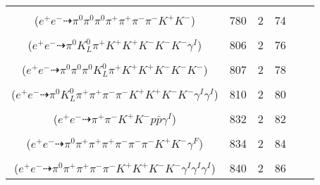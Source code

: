 \documentclass[landscape]{article}
\newcounter{rownumbers}
\newcommand\rn{\stepcounter{rownumbers}\arabic{rownumbers}}
\newcommand{\EOL}{\\} %
\newcommand{\topoTags}[1]{#1} %
\begin{document}
\begin{longtable}{clcccc}
\rn & \makecell[l]{ $ 
e^{+} e^{-} \rightarrow \pi^{0} \pi^{0} \pi^{+} \pi^{+} \pi^{-} \rho^{-} K^{+} K^{-} ,
\rho^{-} \rightarrow \pi^{0} \pi^{-} 
$ \\ ($
e^{+} e^{-} \dashrightarrow \pi^{0} \pi^{0} \pi^{0} \pi^{+} \pi^{+} \pi^{-} \pi^{-} K^{+} K^{-} 
$) } & \topoTags{780 & }2 & 74 \EOL

\rn & \makecell[l]{ $ 
e^{+} e^{-} \rightarrow \pi^{0} \pi^{+} K^{0} K^{-} \phi \phi \gamma^{I} ,
K^{0} \rightarrow K_{L}^{0} ,
\phi \rightarrow K^{+} K^{-} ,
\phi \rightarrow K^{+} K^{-} 
$ \\ ($
e^{+} e^{-} \dashrightarrow \pi^{0} K_{L}^{0} \pi^{+} K^{+} K^{+} K^{-} K^{-} K^{-} \gamma^{I} 
$) } & \topoTags{806 & }2 & 76 \EOL

\rn & \makecell[l]{ $ 
e^{+} e^{-} \rightarrow \pi^{0} \pi^{0} K^{+} K^{+} K^{-} K^{-} K^{*+} K^{*-} ,
K^{*+} \rightarrow \pi^{+} K^{0} ,
K^{*-} \rightarrow \pi^{0} K^{-} ,
K^{0} \rightarrow K_{L}^{0} 
$ \\ ($
e^{+} e^{-} \dashrightarrow \pi^{0} \pi^{0} \pi^{0} K_{L}^{0} \pi^{+} K^{+} K^{+} K^{-} K^{-} K^{-} 
$) } & \topoTags{807 & }2 & 78 \EOL

\rn & \makecell[l]{ $ 
e^{+} e^{-} \rightarrow \pi^{+} \rho^{-} K^{0} \bar{K}^{0} K^{+} K^{-} \phi \gamma^{I} \gamma^{I} ,
\rho^{-} \rightarrow \pi^{0} \pi^{-} ,
K^{0} \rightarrow K_{S}^{0} ,
\bar{K}^{0} \rightarrow K_{L}^{0} ,
\phi \rightarrow K^{+} K^{-} ,
K_{S}^{0} \rightarrow \pi^{+} \pi^{-} 
$ \\ ($
e^{+} e^{-} \dashrightarrow \pi^{0} K_{L}^{0} \pi^{+} \pi^{+} \pi^{-} \pi^{-} K^{+} K^{+} K^{-} K^{-} \gamma^{I} \gamma^{I} 
$) } & \topoTags{810 & }2 & 80 \EOL

\rn & \makecell[l]{ $ 
e^{+} e^{-} \rightarrow \pi^{+} \pi^{-} K^{+} K^{-} p \bar{p} \gamma^{I} 
$ \\ ($
e^{+} e^{-} \dashrightarrow \pi^{+} \pi^{-} K^{+} K^{-} p \bar{p} \gamma^{I} 
$) } & \topoTags{832 & }2 & 82 \EOL

\rn & \makecell[l]{ $ 
e^{+} e^{-} \rightarrow \pi^{0} \rho^{0} \pi^{+} \pi^{-} K^{*} \bar{K}^{*} ,
\rho^{0} \rightarrow \pi^{+} \pi^{-} \gamma^{F} ,
K^{*} \rightarrow \pi^{-} K^{+} ,
\bar{K}^{*} \rightarrow \pi^{+} K^{-} 
$ \\ ($
e^{+} e^{-} \dashrightarrow \pi^{0} \pi^{+} \pi^{+} \pi^{+} \pi^{-} \pi^{-} \pi^{-} K^{+} K^{-} \gamma^{F} 
$) } & \topoTags{834 & }2 & 84 \EOL

\rn & \makecell[l]{ $ 
e^{+} e^{-} \rightarrow \pi^{+} \pi^{-} \pi^{-} \bar{K}^{*} K^{+} K^{-} K^{*+} \gamma^{I} \gamma^{I} \gamma^{I} ,
\bar{K}^{*} \rightarrow \pi^{+} K^{-} ,
K^{*+} \rightarrow \pi^{0} K^{+} 
$ \\ ($
e^{+} e^{-} \dashrightarrow \pi^{0} \pi^{+} \pi^{+} \pi^{-} \pi^{-} K^{+} K^{+} K^{-} K^{-} \gamma^{I} \gamma^{I} \gamma^{I} 
$) } & \topoTags{840 & }2 & 86 \EOL


\end{longtable}
\end{document}
